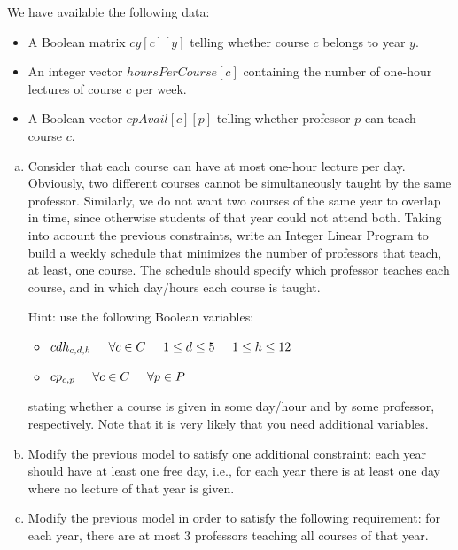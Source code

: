 \documentclass[11pt, oneside]{article}   	%
\begin{document}
We have available the following data:

\begin{itemize}
\item A Boolean matrix $cy[c][y]$ telling whether course $c$ belongs to year $y$.
\item An integer vector $hoursPerCourse[c]$ containing the number of one-hour lectures of course $c$ per week.
\item A Boolean vector $cpAvail[c][p]$ telling whether professor $p$ can teach course $c$.
\end{itemize}

\begin{enumerate}[(a)]
\item Consider that each course can have at most one-hour lecture per day. Obviously, two different courses cannot be simultaneously taught by the same professor. Similarly, we do not want two courses of the same year to overlap in time, since otherwise students of that year could not attend both. Taking into account the previous constraints, write an Integer Linear Program to build a weekly schedule that minimizes the number of professors that teach, at least, one course. The schedule should specify which professor teaches each course, and in which day/hours each course is taught.

Hint: use the following Boolean variables:

\begin{itemize}
\item $cdh_{c,d,h} \hspace{5 mm} \forall c \in C \hspace{5 mm} 1 \leq d \leq 5 \hspace{5 mm} 1 \leq h \leq 12$
\item $cp_{c,p} \hspace{5 mm} \forall c \in C \hspace{5 mm} \forall p \in P$
\end{itemize}

stating whether a course is given in some day/hour and by some professor, respectively. Note that it is very likely that you need additional variables.

\item Modify the previous model to satisfy one additional constraint: each year should have at least one free day, i.e., for each year there is at least one day where no lecture of that year is given.
\item Modify the previous model in order to satisfy the following requirement: for each year, there are at most 3 professors teaching all courses of that year.
\end{enumerate}
\end{document}
